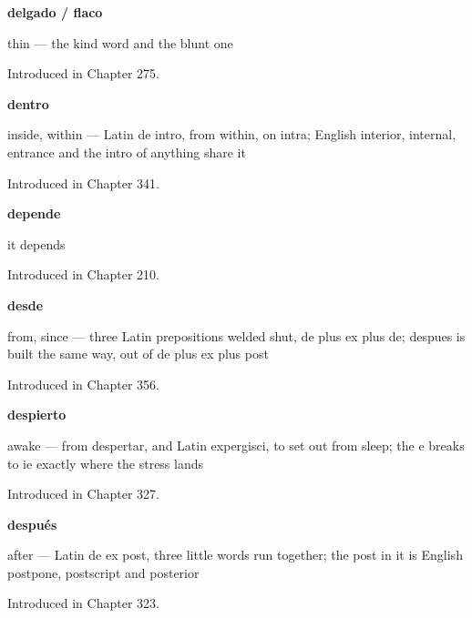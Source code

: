 \noindent\begin{minipage}[t]{\linewidth}
\raggedright
\textbf{delgado / flaco}\par
\small thin — the kind word and the blunt one\par
\footnotesize Introduced in Chapter 275.
\end{minipage}\par\medskip

\noindent\begin{minipage}[t]{\linewidth}
\raggedright
\textbf{dentro}\par
\small inside, within — Latin de intro, from within, on intra; English interior, internal, entrance and the intro of anything share it\par
\footnotesize Introduced in Chapter 341.
\end{minipage}\par\medskip

\noindent\begin{minipage}[t]{\linewidth}
\raggedright
\textbf{depende}\par
\small it depends\par
\footnotesize Introduced in Chapter 210.
\end{minipage}\par\medskip

\noindent\begin{minipage}[t]{\linewidth}
\raggedright
\textbf{desde}\par
\small from, since — three Latin prepositions welded shut, de plus ex plus de; despues is built the same way, out of de plus ex plus post\par
\footnotesize Introduced in Chapter 356.
\end{minipage}\par\medskip

\noindent\begin{minipage}[t]{\linewidth}
\raggedright
\textbf{despierto}\par
\small awake — from despertar, and Latin expergisci, to set out from sleep; the e breaks to ie exactly where the stress lands\par
\footnotesize Introduced in Chapter 327.
\end{minipage}\par\medskip

\noindent\begin{minipage}[t]{\linewidth}
\raggedright
\textbf{después}\par
\small after — Latin de ex post, three little words run together; the post in it is English postpone, postscript and posterior\par
\footnotesize Introduced in Chapter 323.
\end{minipage}\par\medskip

